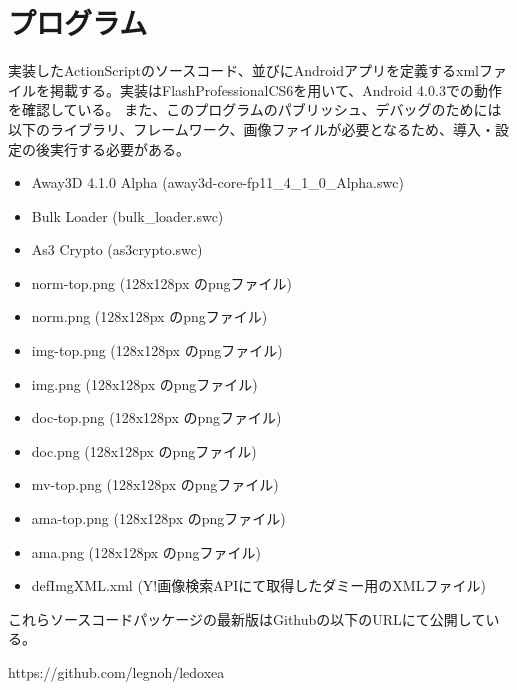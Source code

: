 \chapter{プログラム}
実装したActionScriptのソースコード、並びにAndroidアプリを定義するxmlファイルを掲載する。実装はFlashProfessionalCS6を用いて、Android 4.0.3での動作を確認している。
また、このプログラムのパブリッシュ、デバッグのためには以下のライブラリ、フレームワーク、画像ファイルが必要となるため、導入・設定の後実行する必要がある。
\begin{itemize}
\item Away3D 4.1.0 Alpha (away3d-core-fp11\_4\_1\_0\_Alpha.swc)\cite{away3d}
\item Bulk Loader (bulk\_loader.swc)\cite{bulkloader}
\item As3 Crypto (as3crypto.swc)\cite{as3crypto}
\item norm-top.png (128x128px のpngファイル)
\item norm.png (128x128px のpngファイル)
\item img-top.png (128x128px のpngファイル)
\item img.png (128x128px のpngファイル)
\item doc-top.png (128x128px のpngファイル)
\item doc.png (128x128px のpngファイル)
\item mv-top.png (128x128px のpngファイル)
\item ama-top.png (128x128px のpngファイル)
\item ama.png (128x128px のpngファイル)
\item defImgXML.xml (Y!画像検索APIにて取得したダミー用のXMLファイル)
\end{itemize}

これらソースコードパッケージの最新版はGithubの以下のURLにて公開している。 

https://github.com/legnoh/ledoxea
